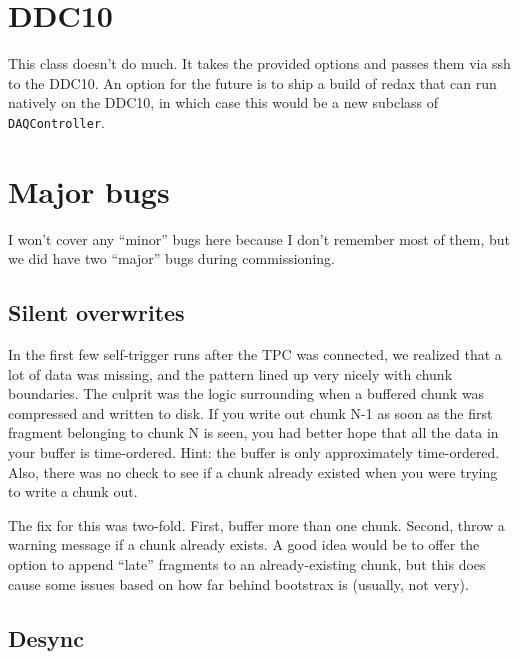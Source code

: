 \section{DDC10}

This class doesn't do much.
It takes the provided options and passes them via ssh to the DDC10.
An option for the future is to ship a build of redax that can run natively on the DDC10, in which case this would be a new subclass of \texttt{DAQController}.

\section{Major bugs}

I won't cover any ``minor'' bugs here because I don't remember most of them, but we did have two ``major'' bugs during commissioning.

\subsection{Silent overwrites}

In the first few self-trigger runs after the TPC was connected, we realized that a lot of data was missing, and the pattern lined up very nicely with chunk boundaries.
The culprit was the logic surrounding when a buffered chunk was compressed and written to disk.
If you write out chunk N-1 as soon as the first fragment belonging to chunk N is seen, you had better hope that all the data in your buffer is time-ordered.
Hint: the buffer is only approximately time-ordered.
Also, there was no check to see if a chunk already existed when you were trying to write a chunk out.

The fix for this was two-fold.
First, buffer more than one chunk.
Second, throw a warning message if a chunk already exists.
A good idea would be to offer the option to append ``late'' fragments to an already-existing chunk, but this does cause some issues based on how far behind bootstrax is (usually, not very).

\subsection{Desync}

